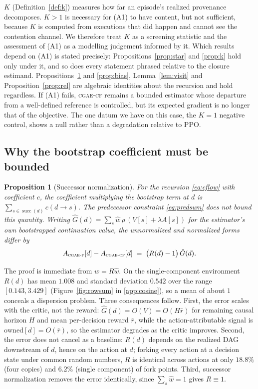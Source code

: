 \documentclass[review,authoryear,3p,times]{elsarticle}
\newtheorem{proposition}{Proposition}
\newcommand{\cflow}{\textsc{cgae-cf}}          %
\newcommand{\cflowraw}{\textsc{cgae-f}}        %
\newcommand{\suc}{\operatorname{succ}}
\begin{document}
$K$ (Definition~\ref{def:k}) measures how far an episode's realized provenance
decomposes. $K>1$ is necessary for (A1) to have content, but not sufficient,
because $K$ is computed from executions that did happen and cannot see the
contention channel. We therefore treat $K$ as a screening statistic and the
assessment of (A1) as a modelling judgement informed by it. Which results
depend on (A1) is stated precisely: Propositions~\ref{prop:star} and
\ref{prop:k} hold only under it, and so does every statement phrased relative
to the closure estimand. Propositions~\ref{prop:s} and \ref{prop:bias},
Lemma~\ref{lem:visit} and Proposition~\ref{prop:rel} are algebraic identities
about the recursion and hold regardless. If (A1) fails, \cflow{} remains a
bounded estimator whose departure from a well-defined reference is controlled,
but its expected gradient is no longer that of the objective. The one datum we
have on this case, the $K=1$ negative control, shows a null rather than a
degradation relative to PPO.

\subsection{Why the bootstrap coefficient must be bounded}

\begin{proposition}[Successor normalization]
\label{prop:s}
For the recursion \eqref{eq:cflow} with coefficient $c$, the coefficient
multiplying the bootstrap term at $d$ is $\sum_{s\in\suc(d)}c(d\!\to\!s)$. The
predecessor constraint \eqref{eq:predsum} does not bound this quantity. Writing
$\hat{G}(d)=\sum_s \hat w\,\rho\,(V[s]+\lambda A[s])$ for the estimator's own
bootstrapped continuation value, the unnormalized and normalized forms differ by
\begin{equation}
A_{\cflowraw}[d]-A_{\cflow}[d] \;=\; \bigl(R(d)-1\bigr)\,\hat{G}(d).
\label{eq:defect}
\end{equation}
\end{proposition}

The proof is immediate from $w=R\hat w$. On the single-component environment
$R(d)$ has mean $1.008$ and standard deviation $0.542$ over the range
$[0.143,3.429]$ (Figure~\ref{fig:rowsum} in \ref{app:cosine}), so a mean of
about $1$ conceals a dispersion problem. Three consequences follow. First, the
error scales with the critic, not the reward: $\hat{G}(d)=O(V)=O(H\bar r)$ for
remaining causal horizon $H$ and mean per-decision reward $\bar r$, while the
action-attributable signal is $\mathrm{owned}[d]=O(\bar r)$, so the estimator
degrades as the critic improves. Second, the error does not cancel as a
baseline: $R(d)$ depends on the realized DAG downstream of $d$, hence on the
action at $d$; forking every action at a decision state under common random
numbers, $R$ is identical across actions at only $18.8\%$ (four copies) and
$6.2\%$ (single component) of fork points. Third, successor normalization
removes the error identically, since $\sum_s\hat w=1$ gives $R\equiv1$.
\end{document}
